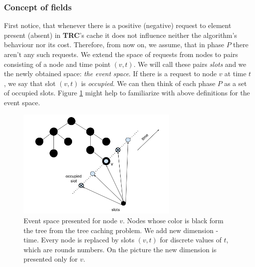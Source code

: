 \subsubsection{Concept of fields}
First notice, that whenever there is a positive (negative) request to element 
present (absent) in \textbf{TRC}'s cache it does not influence neither the 
algorithm's behaviour nor its cost. Therefore, from now on, we assume, that in
phase $P$ there aren't any such requests. We extend the space of requests from nodes to pairs
consisting of a node and time point $(v, t)$. We will call these pairs \textit{slots} and we 
the newly obtained space: \textit{the event space}. If there is a request to node $v$ at time
$t$, we say that slot $(v, t)$ is \textit{occupied}. We can then think of each phase $P$ as
a set of occupied slots. Figure \ref{fig:spacial_temporal} might help to familiarize with
above definitions for the event space.
\begin{figure}
 \begin{center}
  \includegraphics[width=0.7\textwidth]{spacial_temporal.png}
 \end{center}
 \caption{Event space presented for node $v$. Nodes whose color is black form 
the tree from the tree caching problem.  We add new dimension - time. Every node
is replaced by slots $(v, t)$ for discrete values of $t$, which are rounds 
numbers. On the picture the new dimension is presented only for $v$.}
 \label{fig:spacial_temporal}
\end{figure}

